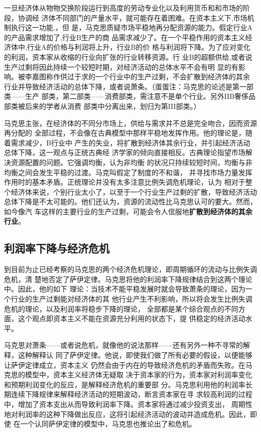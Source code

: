 一旦经济体从物物交换阶段运行到高度的劳动专业化以及利用货币和和市场的阶段，协调经
济体不同部门的产量水平，就可能存在着困难。在资本主义下,市场机制执行这一功能,，但
是，马克思质疑市场平稳地再分配资源的能力。假定行业A的产品需求增加了,行业B生产的商
品需求减少了。在一个平稳作用的资本主义经济体中,行业A的价格与利润将上升，行业B的价
格与利润将下降。为了应对变化的利润，资本家从收缩的行业向扩张的行业转移资源。行
业B的超额供给,或者说生产过剩将因此持续一个较短时期，对经济活动的总体水平不会有明
显的有影响。被李嘉图称作供过于求的一个行业中的生产过剩，不会扩散到经济体的其余
行业并导致经济活动的总体下降，或者说萧条。（蛋蛋注：马克思的论述是第一部类——生产
部类，第二部类——消费部类，需注意不是单个行业。另外IIB奢侈品部类被后来的学者从消费
部类中分离出来，划归为第III部类。）

马克思主张，在经济体的不同分市场上，供给与需求并不总是完全吻合，因而资源再分配的
全部过程，不会像在古典模型中那样平稳地发挥作用。他的理论是，随着需求减少，B行业中
产生的失业，将扩散到经济体其余行业，并引起经济活动总体下降，这一观点与正统古典经
济学家的倾向直接相反。古典理论指望市场解决资源配置的问题。它强调均衡，认为非均衡
的状况只持续较短时间，均衡与非均衡之间会发生平稳的过渡。马克叫假定了制度的不和谐，
并寻找市场力量发挥作用时的基本矛盾。正统理论并没有太多注意比例失调危机理论，认为
相对于整个经济体来说，个别行业太小了，以至于一个行业生产过剩的扩散，导致经济活动
总体下降是不太可能的。他们还认为，资源的流动性比马克思认可的要大。然而，如今像汽
车这样的主要行业的生产过剩，可能会令人信服地\textbf{扩散到经济体的其余行业}。

\subsection{利润率下降与经济危机}

到目前为止已经考察的马克思的两个经济危机理论，即周期循环的流动与比例失调危机，清
楚地否定了萨伊定律。马克思将他的利润率下降规律结合到这两个理论中。因此，他的如下
理论：当技术不能平稳发展时就会导致萧条的理论，因为一个行业的生产过剩能对经济体的其
他行业产生不利影响，所以将会发生比例失调危机的理论，以及利润率将稳步下降的理论，
全部都是某个综合观点的不同方面，这个观点即资本主义不能在资源充分利用的状态下，提
供稳定的经济活动水平。

马克思对萧条——或者说危机，就像他的说法那样——还有另外一种不寻常的解释，这种解释认
同了萨伊定律。他说，即使我们做了所有必要的假设，以便能够让萨伊定律成立，资本主义
仍然会由于内在的导致经济危机的矛盾而失败。在马克思的模型中，资本主义经济体无疑取
决于资本家的行为，资本家对利润率变化和预期利润变化的反应，是解释经济危机的重要部
分。马克思利用他的利润率长期连续下降规律来解释经济活动的短期波动，断言资本家在寻
求较高利润的过程中，增加了资本支出从而导致利润率下降。资本家将通过减少投资支出，
周期性地对利润率的这种下降做出反应，这将引起经济活动的波动并造成危机。因此，即使
在一个认同萨伊定律的模型中，马克思也推论出了和危机。

